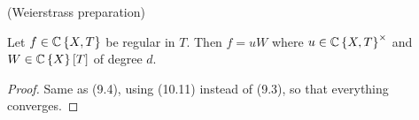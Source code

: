 \begin{cor*}
\label{10.12} (Weierstrass preparation)

Let $f\in\mathbb{C}\left\{ X,T\right\} $ be regular in $T$. Then $f=uW$
where $u\in\mathbb{C}\left\{ X,T\right\} ^{\times}$ and $W\in\mathbb{C}\left\{ X\right\} \left[T\right]$
of degree $d$.\end{cor*}
\begin{proof}
Same as (9.4), using (10.11) instead of (9.3), so that everything
converges.\end{proof}